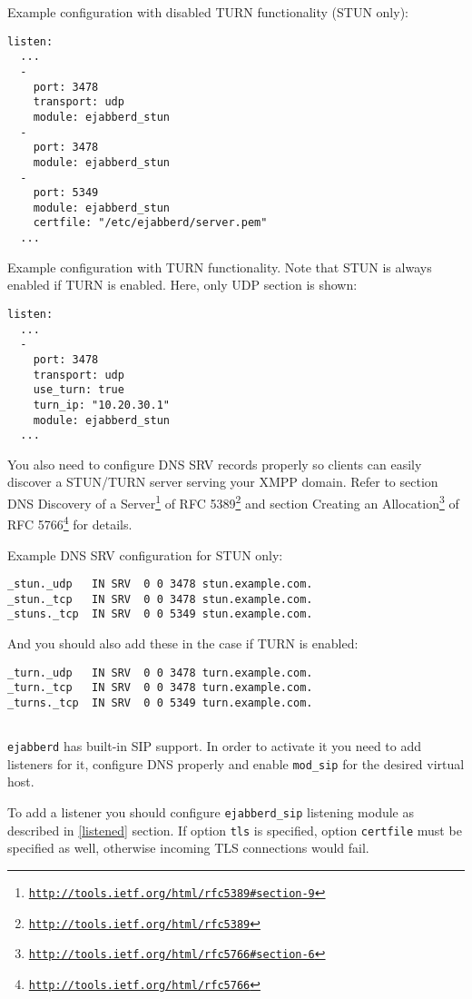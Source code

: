 \documentclass[a4paper,10pt]{book}
\newcommand{\ind}[1]{\begin{latexonly}\index{#1}\end{latexonly}}
\newcommand{\makesubsection}[2]{ \aname{#1}{} \subsection{\ahrefloc{#1}{#2}} \label{#1} }
\newcommand{\option}[1]{\texttt{#1}}
\newcommand{\term}[1]{\texttt{#1}}
\newcommand{\ejabberd}{\texttt{ejabberd}}
\newcommand{\module}[1]{\texttt{#1}}
\newcommand{\modsip}{\module{mod\_sip}}
\gdef\footahref#1#2{#2\footnote{\href{#1}{\texttt{#1}}}}
\begin{document}
Example configuration with disabled TURN functionality (STUN only):
\begin{verbatim}
listen:
  ...
  - 
    port: 3478
    transport: udp
    module: ejabberd_stun
  - 
    port: 3478
    module: ejabberd_stun
  -
    port: 5349
    module: ejabberd_stun
    certfile: "/etc/ejabberd/server.pem"
  ...
\end{verbatim}

Example configuration with TURN functionality. Note that STUN is always
enabled if TURN is enabled. Here, only UDP section is shown:
\begin{verbatim}
listen:
  ...
  - 
    port: 3478
    transport: udp
    use_turn: true
    turn_ip: "10.20.30.1"
    module: ejabberd_stun
  ...
\end{verbatim}

You also need to configure DNS SRV records properly so clients can easily discover a
STUN/TURN server serving your XMPP domain. Refer to section
\footahref{http://tools.ietf.org/html/rfc5389\#section-9}{DNS Discovery of a Server}
of \footahref{http://tools.ietf.org/html/rfc5389}{RFC 5389} and section
\footahref{http://tools.ietf.org/html/rfc5766\#section-6}{Creating an Allocation}
of \footahref{http://tools.ietf.org/html/rfc5766}{RFC 5766} for details.

Example DNS SRV configuration for STUN only:
\begin{verbatim}
_stun._udp   IN SRV  0 0 3478 stun.example.com.
_stun._tcp   IN SRV  0 0 3478 stun.example.com.
_stuns._tcp  IN SRV  0 0 5349 stun.example.com.
\end{verbatim}

And you should also add these in the case if TURN is enabled:
\begin{verbatim}
_turn._udp   IN SRV  0 0 3478 turn.example.com.
_turn._tcp   IN SRV  0 0 3478 turn.example.com.
_turns._tcp  IN SRV  0 0 5349 turn.example.com.
\end{verbatim}

\makesubsection{sip}{SIP}
\ind{options!sip}\ind{sip}

\ejabberd{} has built-in SIP support. In order to activate it you need to add
listeners for it, configure DNS properly and enable \modsip{} for
the desired virtual host.

To add a listener you should configure \term{ejabberd\_sip} listening module as
described in \ref{listened} section. If option \option{tls} is specified, option
\option{certfile} must be specified as well, otherwise incoming TLS connections would fail.
\end{document}
